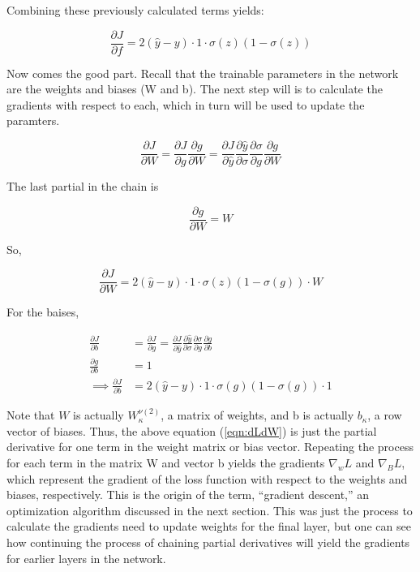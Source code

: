 \noindent Combining these previously calculated terms yields:

\begin{equation}
\frac{\partial J}{\partial f} = 2(\hat{y} - y ) \cdot 1 \cdot  \sigma(z)(1 - \sigma(z))
\end{equation}

Now comes the good part. Recall that the trainable parameters in the network are the weights and biases (W and b). The next step will is to calculate the gradients with respect to each, which in turn will be used to update the paramters.

\begin{equation}
\frac{\partial J}{\partial W} = \frac{\partial J}{\partial g}\frac{\partial g}{\partial W} = \frac{\partial J}{\partial \hat{y}} \frac{\partial \hat{y}}{\partial \sigma} \frac{\partial \sigma}{\partial g} \frac{\partial g}{\partial W}
\end{equation}

\noindent The last partial in the chain is

\begin{equation}
\frac{\partial g}{\partial W} = W
\end{equation}


\noindent So,

\begin{equation}
\frac{\partial J}{\partial W} = 2(\hat{y} - y ) \cdot 1 \cdot  \sigma(z)(1 - \sigma(g)) \cdot W
\end{equation}

\noindent For the baises,

\begin{align}
\label{eqn:dLdW}
\frac{\partial J}{\partial b} &= \frac{\partial J}{\partial g} = \frac{\partial J}{\partial \hat{y}} \frac{\partial \hat{y}}{\partial \sigma} \frac{\partial \sigma}{\partial g} \frac{\partial g}{\partial b} \\
\frac{\partial g}{\partial b} &= 1 \\
\implies \frac{\partial J}{\partial b} &= 2(\hat{y} - y ) \cdot 1 \cdot  \sigma(g)(1 - \sigma(g)) \cdot 1
\end{align}

Note that $ W $ is actually $ W_\kappa ^{\nu (2)} $, a matrix of weights, and b is actually $ b_\kappa $, a row vector of biases. Thus, the above equation (\ref{eqn:dLdW}) is just the partial derivative for one term in the weight matrix or bias vector. Repeating the process for each term in the matrix W and vector b yields the gradients $ \nabla_w L $  and $ \nabla_B L $, which represent the gradient of the loss function with respect to the weights and biases, respectively. This is the origin of the term, ``gradient descent,'' an optimization algorithm discussed in the next section. This was just the process to calculate the gradients need to update weights for the final layer, but one can see how continuing the process of chaining partial derivatives will yield the gradients for earlier layers in the network.

